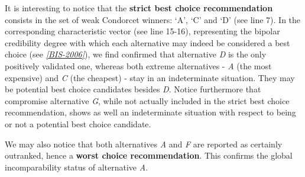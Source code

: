 \documentclass[letterpaper,10pt,english]{sphinxmanual}
\begin{document}
It is interesting to notice that the \textbf{strict best choice recommendation} consists in the set of weak Condorcet winners: `A', `C' and `D' (see line 7). In the corresponding characteristic vector (see line 15-16), representing the bipolar credibility degree with which each alternative may indeed be considered a best choice (see \label{tutorial:id28}{\hyperref[tutorial:bis-2006]{\emph{{[}BIS-2006{]}}}}), we find confirmed that alternative \emph{D} is the only positively validated one, whereas both extreme alternatives - \emph{A} (the most expensive) and \emph{C} (the cheapest) - stay in an indeterminate situation. They may be potential best choice candidates besides \emph{D}. Notice furthermore that compromise alternative \emph{G}, while not actually included in the strict best choice recommendation, shows as well an indeterminate situation with respect to being or not a potential best choice candidate.

We may also notice that both alternatives \emph{A} and \emph{F} are reported as certainly outranked, hence a \textbf{worst choice recommendation}. This confirms the global incomparability status of alternative \emph{A}.
\end{document}
